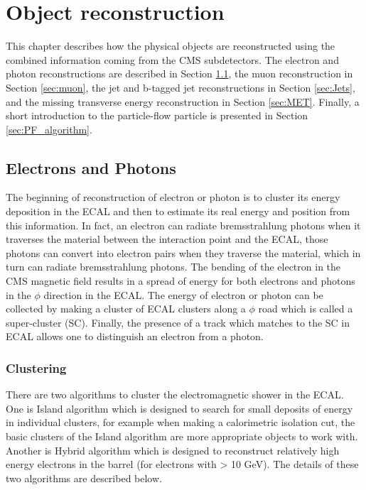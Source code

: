 \chapter{Object reconstruction}\label{chap:Event_reconstruction}
This chapter describes how the physical objects are reconstructed using the combined information coming from the CMS subdetectors. The electron and photon reconstructions are described in Section \ref{sec:electron_photon}, the muon reconstruction in Section \ref{sec:muon}, the jet and b-tagged jet reconstructions in Section \ref{sec:Jets}, and the missing transverse energy reconstruction in Section \ref{sec:MET}. Finally, a short introduction to the particle-flow particle is presented in Section \ref{sec:PF_algorithm}.
\section{Electrons and Photons}\label{sec:electron_photon}
The beginning of reconstruction of electron or photon is to cluster its energy deposition in the ECAL and then to estimate its real energy and position from this information.
In fact, an electron can radiate bremsstrahlung photons when it traverses the material between the interaction point and the ECAL, those photons can convert into electron pairs when they traverse the material, which in turn can radiate bremsstrahlung photons. The bending of the electron in the CMS magnetic field results in a spread of energy for both electrons and photons in the $\phi$ direction in the ECAL. The energy of electron or photon can be collected by making a cluster of ECAL clusters along a $\phi$ road  which is called a super-cluster (SC).
Finally, the presence of a track which matches to the SC in ECAL allows one to distinguish an electron from a photon.
\subsection*{Clustering}\label{subsec:clustering}

There are two algorithms to cluster the electromagnetic shower in the ECAL. One is Island algorithm which is designed to search for small deposits of energy in individual clusters, for example when making a calorimetric isolation cut, the basic clusters of the Island algorithm are more appropriate objects to work with.
Another is Hybrid algorithm which is designed to reconstruct relatively high energy electrons in the barrel (for electrons with \et > 10 GeV). The details of these two algorithms are described below.

